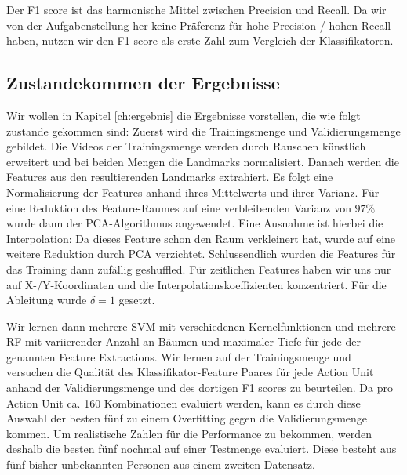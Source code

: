 Der F1 score ist das harmonische Mittel zwischen Precision und Recall. Da wir
von der Aufgabenstellung her keine Präferenz für hohe Precision / hohen Recall
haben, nutzen wir den F1 score als erste Zahl zum Vergleich der Klassifikatoren.

\subsection{Zustandekommen der Ergebnisse}
Wir wollen in Kapitel \ref{ch:ergebnis} die Ergebnisse vorstellen, die wie folgt zustande gekommen sind:
Zuerst wird die Trainingsmenge und Validierungsmenge gebildet.
Die Videos der Trainingsmenge werden durch Rauschen künstlich erweitert und bei beiden Mengen die Landmarks normalisiert.
Danach werden die Features aus den resultierenden Landmarks extrahiert.
Es folgt eine Normalisierung der Features anhand ihres Mittelwerts und ihrer Varianz. 
Für eine Reduktion des Feature-Raumes auf eine verbleibenden Varianz von $97\%$ wurde dann der PCA-Algorithmus angewendet.
Eine Ausnahme ist hierbei die Interpolation: Da dieses Feature schon den Raum verkleinert hat, wurde auf eine weitere Reduktion durch PCA verzichtet.
Schlussendlich wurden die Features für das Training dann zufällig geshuffled. Für zeitlichen Features haben wir uns nur auf X-/Y-Koordinaten und die Interpolationskoeffizienten konzentriert. Für die Ableitung wurde $\delta=1$ gesetzt.

Wir lernen dann mehrere SVM mit verschiedenen Kernelfunktionen und mehrere RF
mit variierender Anzahl an Bäumen und maximaler Tiefe für jede der genannten
Feature Extractions. Wir lernen auf der Trainingsmenge und versuchen die Qualität
des Klassifikator-Feature Paares für jede Action Unit anhand der
Validierungsmenge und des dortigen F1 scores zu beurteilen. Da pro Action Unit
ca. 160 Kombinationen evaluiert werden, kann es durch diese Auswahl der besten
fünf zu einem Overfitting gegen die Validierungsmenge kommen. Um realistische
Zahlen für die Performance zu bekommen, werden deshalb die besten fünf nochmal
auf einer Testmenge evaluiert. Diese besteht aus fünf bisher unbekannten
Personen aus einem zweiten Datensatz.


